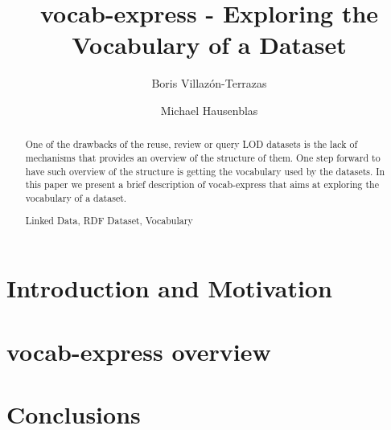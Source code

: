 \documentclass{llncs}
\newcommand{\keywords}[1]{\par\addvspace\baselineskip
\noindent\keywordname\enspace\ignorespaces#1}
\begin{document}

\title{vocab-express - Exploring the Vocabulary of a Dataset}


%
%
\author{Boris Villaz\'{o}n-Terrazas\and Michael Hausenblas}
%




%
%

\maketitle
\begin{abstract}
One of the drawbacks of the reuse, review or query LOD datasets is the lack of mechanisms that provides an overview of the structure of them.
One step forward to have such overview of the structure is getting the vocabulary used by the datasets. In this paper we present a brief description of vocab-express that aims at exploring the vocabulary of a dataset.
\keywords{Linked Data, RDF Dataset, Vocabulary} 
\end{abstract}

\vspace{-2mm}
\section{Introduction and Motivation}\label{sec:introduction}


\vspace{-2mm}
\section{vocab-express overview}\label{sec:vocab}


\vspace{-4mm}
\section{Conclusions}\label{sec:conclusions}


 

\vspace{-2mm}
 
 
\end{document}
